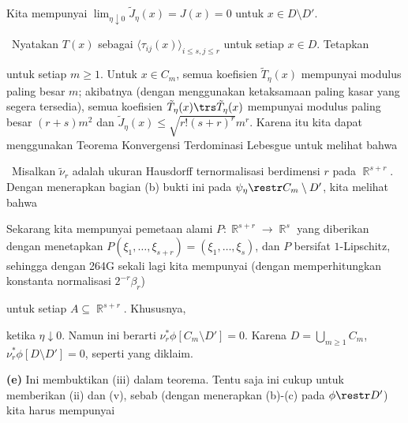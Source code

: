 {\noindent Kita mempunyai
$\lim_{\eta\downarrow 0}\tilde J_{\eta}(x)=J(x)=0$ untuk
$x\in D\setminus D'$.

\medskip

\quad\grheadb\ Nyatakan $T(x)$ sebagai
$\langle\tau_{ij}(x)\rangle_{i\le s,j\le r}$ untuk setiap $x\in D$.
Tetapkan


\noindent untuk setiap $m\ge 1$. Untuk $x\in C_m$, semua koefisien
$\tilde T_{\eta}(x)$ mempunyai modulus paling besar $m$; akibatnya
(dengan menggunakan ketaksamaan paling kasar yang segera tersedia),
semua koefisien $\tilde T_{\eta}(x)\trs \tilde T_{\eta}(x)$ mempunyai
modulus paling besar $(r+s)m^2$ dan
$\tilde J_{\eta}(x)\le\sqrt{r!(s+r)^r}m^r$. Karena itu kita dapat
menggunakan Teorema Konvergensi Terdominasi Lebesgue untuk melihat bahwa


\medskip

\quad\grheadc\ Misalkan $\tilde\nu_r$ adalah ukuran Hausdorff
ternormalisasi berdimensi $r$ pada $\BbbR^{s+r}$. Dengan menerapkan
bagian (b) bukti ini pada $\psi_{\eta}\restr C_m\setminus D'$, kita
melihat bahwa


\noindent Sekarang kita mempunyai pemetaan alami
$P:\BbbR^{s+r}\to\BbbR^s$ yang diberikan dengan menetapkan
$P(\xi_1,\ldots,\xi_{s+r})=(\xi_1,\ldots,\xi_s)$, dan $P$ bersifat
$1$-Lipschitz, sehingga dengan 264G sekali lagi kita mempunyai (dengan
memperhitungkan konstanta normalisasi $2^{-r}\beta_r$)


\noindent untuk setiap $A\subseteq\BbbR^{s+r}$. Khususnya,


\noindent ketika $\eta\downarrow 0$. Namun ini berarti
$\nu_r^*\phi[C_m\setminus D']=0$. Karena
$D=\bigcup_{m\ge 1}C_m$, $\nu_r^*\phi[D\setminus D']=0$, seperti yang
diklaim. \Qed

\medskip

{\bf (e)} Ini membuktikan (iii) dalam teorema. Tentu saja ini cukup
untuk memberikan (ii) dan (v), sebab (dengan menerapkan (b)-(c) pada
$\phi\restr D'$) kita harus mempunyai

}
